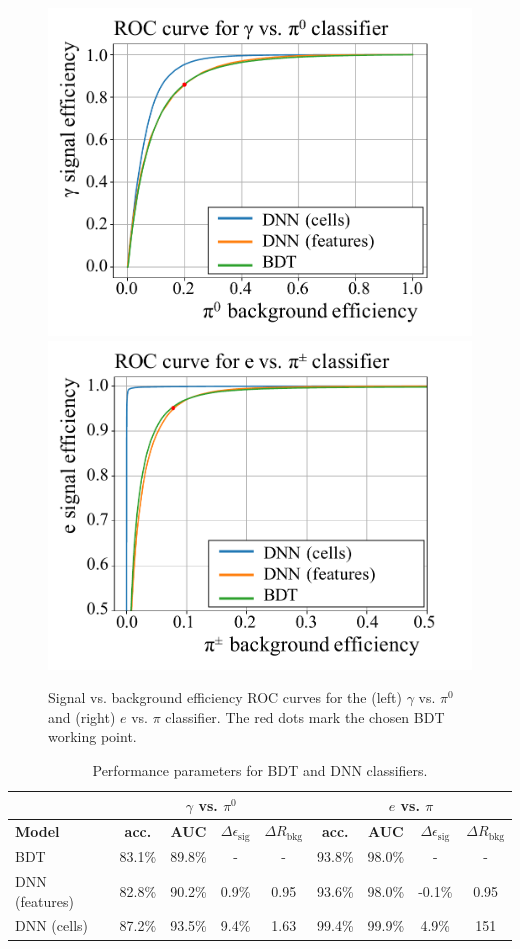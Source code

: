 \documentclass{article}
\begin{document}
\begin{figure}[!t]
    \centering
    \includegraphics[width=0.33\linewidth]{images/photon_pi0.pdf}
    \includegraphics[width=0.33\linewidth]{images/electron_chpi.pdf}
    \caption{Signal vs. background efficiency ROC curves for the (left) $\gamma$ vs. $\pi^0$ and (right) $e$ vs. $\pi$ classifier. The red dots mark the chosen BDT working point.}
    \label{ROCs}
\end{figure}

\begin{table}[!ht]
    \centering
    \begin{tabular}[!t]{l|cccc|cccc}
        \hline
        & \multicolumn{4}{c}{\textbf{$\gamma$ vs. $\pi^0$}} & \multicolumn{4}{c}{\textbf{$e$ vs. $\pi$}}\\
        \hline
        \textbf{Model} & \textbf{acc.} &  \textbf{AUC} & \textbf{$\Delta \epsilon_{\mathrm{sig}}$} & \textbf{$\Delta R_{\mathrm{bkg}}$} & \textbf{acc.} &  \textbf{AUC} & \textbf{$\Delta \epsilon_{\mathrm{sig}}$} & \textbf{$\Delta R_{\mathrm{bkg}}$} \\
        \hline
        \centering
        BDT & 83.1\% & 89.8\% & - & - & 93.8\% & 98.0\% & - & - \\
        DNN (features) & 82.8\% & 90.2\% & 0.9\% & 0.95 & 93.6\% & 98.0\% & -0.1\% & 0.95 \\
        DNN (cells) & 87.2\% & 93.5\% & 9.4\% & 1.63 & 99.4\% & 99.9\% & 4.9\% & 151 \\
        \hline
        \hline
    \end{tabular}
    \vspace{5pt}
    \caption{Performance parameters for BDT and DNN classifiers.} 
    \label{AUCs}
\end{table}
\end{document}

